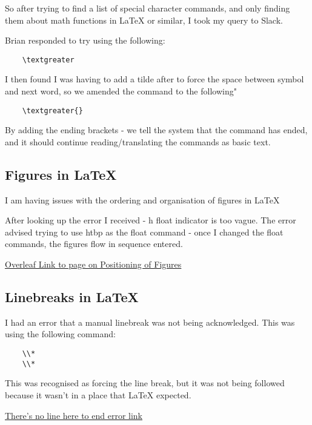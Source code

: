 \documentclass{article}
\begin{document}
So after trying to find a list of special character commands, and only finding them about math functions in LaTeX or similar, I took my query to Slack.

Brian responded to try using the following: 
\begin{verbatim}
    \textgreater
\end{verbatim}

I then found I was having to add a tilde after to force the space between symbol and next word, so we amended the command to the following"
\begin{verbatim}
    \textgreater{}
\end{verbatim}

By adding the ending brackets - we tell the system that the command has ended, and it should continue reading/translating the commands as basic text.

\subsection{Figures in LaTeX}
\label{Error: Figures in LaTeX}

I am having issues with the ordering and organisation of figures in LaTeX

After looking up the error I received - h float indicator is too vague. The error advised trying to use htbp as the float command - once I changed the float commands, the figures flow in sequence entered.

\href{https://www.overleaf.com/learn/latex/Positioning_of_Figures}{Overleaf Link to page on Positioning of Figures}

\subsection{Linebreaks in LaTeX}
\label{Error: Linebreaks in LaTeX}

I had an error that a manual linebreak was not being acknowledged. This was using the following command:
\begin{verbatim}
    \\*
    \\*
\end{verbatim}

This was recognised as forcing the line break, but it was not being followed because it wasn't in a place that LaTeX expected. 

\href{https://www.overleaf.com/learn/latex/Errors/LaTeX_Error:_There's_no_line_here_to_end}{There's no line here to end error link}
\end{document}

